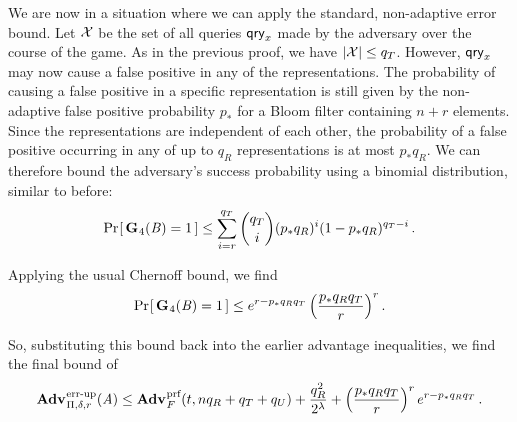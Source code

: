 We are now in a situation where we can apply the standard, non-adaptive error bound. Let $\mathcal{X}$ be the set of all queries $\mathsf{qry}_x$ made by the adversary over the course of the game. As in the previous proof, we have $|\mathcal{X}| \le q_T$. However, $\mathsf{qry}_x$ may now cause a false positive in any of the representations. The probability of causing a false positive in a specific representation is still given by the non-adaptive false positive probability $p_*$ for a Bloom filter containing $n+r$ elements. Since the representations are independent of each other, the probability of a false positive occurring in any of up to $q_R$ representations is at most $p_*q_R$. We can therefore bound the adversary's success probability using a binomial distribution, similar to before:
\begin{equation}
   \Pr\hspace{-1pt}\left[\,\textup{\textbf{G}}\hspace{0.5pt}_4(\mathit{B})=1\,\right] \le
     \sum_{i=r}^{q_T} \binom{q_T}{i}(p_*q_R)^i(1-p_*q_R)^{q_T-i} \,.
\end{equation}

Applying the usual Chernoff bound, we find
\begin{equation}
   \Pr\hspace{-1pt}\left[\,\textup{\textbf{G}}\hspace{0.5pt}_4(\mathit{B})=1\,\right] \le
     e^{r-p_*q_Rq_T}\left(\frac{p_*q_Rq_T}{r}\right)^r.
\end{equation}

So, substituting this bound back into the earlier advantage inequalities, we find the final bound of
\begin{equation}
  \Adv{\errep}_{\Pi,\delta,r}(\advA) \leq
      \Adv{\prf}_F(t,nq_R+q_T+q_U) +
      \frac{q_R^2}{2^\lambda} +
      \left(\frac{p_*q_Rq_T}{r}\right)^re^{r-p_*q_Rq_T}
    \,.
\end{equation}